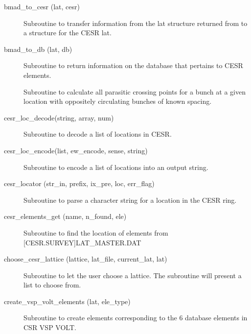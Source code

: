 \begin{description}

\item[bmad_to_cesr (lat, cesr)] \Newline
Subroutine to transfer information from the lat structure returned from 
 to a structure for the CESR lat.

\item[bmad_to_db (lat, db)] \Newline
Subroutine to return information on the database that pertains to CESR elements. 

\item[\protect\parbox{6in}{cesr_crossings (i_train, j_car, species, n_trains_tot, 
\\ \hspace*{2in}n_cars, cross_positions, n_car_spacing, train_spacing)}] \Newline
Subroutine to calculate all parasitic crossing points for a bunch at a
given location with oppositely circulating bunches of known spacing.

\item[cesr_loc_decode(string, array, num)] \Newline 
Subroutine to decode a list of locations in CESR.

\item[cesr_loc_encode(list, ew_encode, sense, string)] \Newline 
Subroutine to encode a list of locations into an output string.

\item[cesr_locator (str_in, prefix, ix_pre, loc, err_flag)] \Newline 
Subroutine to parse a character string for a location in the CESR ring.

\item[cesr_elements_get (name, n_found, ele)] \Newline 
Subroutine to find the location of elements from [CESR.SURVEY]LAT_MASTER.DAT

\item[choose_cesr_lattice (lattice, lat_file, current_lat, lat)] \Newline
Subroutine to let the user choose a lattice. The subroutine will present a list to choose from. 

\item[create_vsp_volt_elements (lat, ele_type)] \Newline
Subroutine to create elements corresponding to the 6 database elements in CSR VSP VOLT. 


\end{description}
